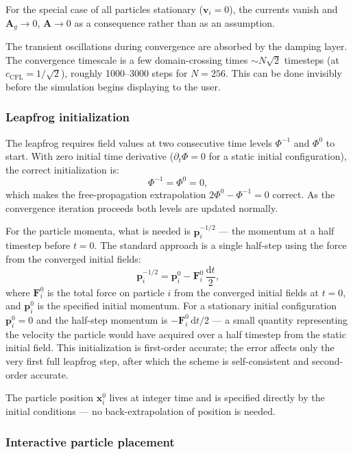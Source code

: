 \documentclass[11pt,a4paper]{article}
\newcommand{\vv}[1]{\mathbf{#1}}
\newcommand{\Ag}{\vv{A}_g}
\newcommand{\dd}{\mathrm{d}}
\begin{document}
For the special case of all particles stationary ($\vv{v}_i = 0$), the currents vanish and $\Ag \to 0$, $\vv{A} \to 0$ as a consequence rather than as an assumption.

The transient oscillations during convergence are absorbed by the damping layer.  The convergence timescale is a few domain-crossing times $\sim N\sqrt{2}$ timesteps (at $c_{\mathrm{CFL}} = 1/\sqrt{2}$), roughly 1000--3000 steps for $N=256$.  This can be done invisibly before the simulation begins displaying to the user.

\subsubsection*{Leapfrog initialization}

The leapfrog requires field values at two consecutive time levels $\Phi^{-1}$ and $\Phi^0$ to start.  With zero initial time derivative ($\partial_t\Phi = 0$ for a static initial configuration), the correct initialization is:
\begin{equation}
  \Phi^{-1} = \Phi^0 = 0,
\end{equation}
which makes the free-propagation extrapolation $2\Phi^0 - \Phi^{-1} = 0$ correct.  As the convergence iteration proceeds both levels are updated normally.

For the particle momenta, what is needed is $\vv{p}_i^{-1/2}$ --- the momentum at a half timestep before $t=0$.  The standard approach is a single half-step using the force from the converged initial fields:
\begin{equation}
  \vv{p}_i^{-1/2} = \vv{p}_i^0 - \vv{F}_i^0\,\frac{\dd t}{2},
\end{equation}
where $\vv{F}_i^0$ is the total force on particle $i$ from the converged initial fields at $t=0$, and $\vv{p}_i^0$ is the specified initial momentum.  For a stationary initial configuration $\vv{p}_i^0 = 0$ and the half-step momentum is $-\vv{F}_i^0\,\dd t/2$ --- a small quantity representing the velocity the particle would have acquired over a half timestep from the static initial field.  This initialization is first-order accurate; the error affects only the very first full leapfrog step, after which the scheme is self-consistent and second-order accurate.

The particle position $\vv{x}_i^0$ lives at integer time and is specified directly by the initial conditions --- no back-extrapolation of position is needed.

\subsubsection*{Interactive particle placement}
\end{document}
